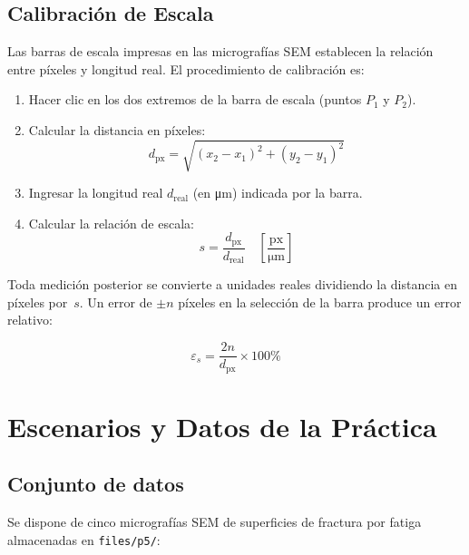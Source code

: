 \documentclass[12pt,a4paper]{article}
\begin{document}
\subsection{Calibración de Escala}
\label{subsec:calibracion}

Las barras de escala impresas en las micrografías SEM establecen la
relación entre píxeles y longitud real.  El procedimiento de calibración
es:

\begin{enumerate}
	\item Hacer clic en los dos extremos de la barra de escala (puntos
	      $P_1$ y $P_2$).
	\item Calcular la distancia en píxeles:
	      \begin{equation}
		      d_\mathrm{px}
		      = \sqrt{(x_2 - x_1)^2 + (y_2 - y_1)^2}
		      \label{eq:dist_px}
	      \end{equation}
	\item Ingresar la longitud real $d_\mathrm{real}$ (en \si{\micro\m})
	      indicada por la barra.
	\item Calcular la relación de escala:
	      \begin{equation}
		      \boxed{s = \frac{d_\mathrm{px}}{d_\mathrm{real}}
			      \quad\left[\frac{\mathrm{px}}{\si{\micro\m}}\right]}
		      \label{eq:escala}
	      \end{equation}
\end{enumerate}

Toda medición posterior se convierte a unidades reales dividiendo la
distancia en píxeles por~$s$.  Un error de $\pm n$ píxeles en la
selección de la barra produce un error relativo:

\begin{equation}
	\varepsilon_s = \frac{2n}{d_\mathrm{px}} \times 100\%
	\label{eq:error_escala}
\end{equation}

\section{Escenarios y Datos de la Práctica}
\label{sec:escenarios}

\subsection{Conjunto de datos}

Se dispone de cinco micrografías SEM de superficies de fractura por fatiga
almacenadas en \texttt{files/p5/}:
\end{document}
